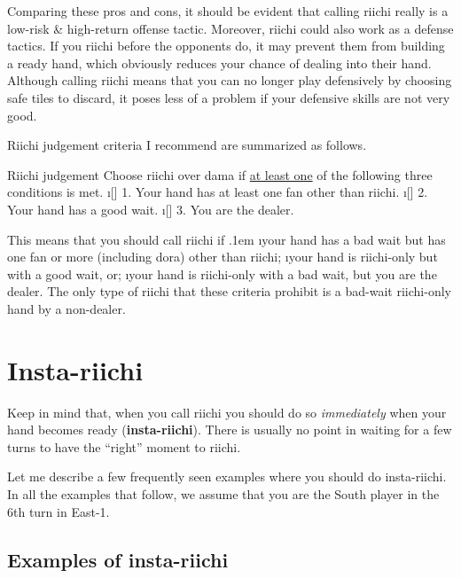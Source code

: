\bigskip
\noindent
Comparing these pros and cons, it should be evident that calling {\jap riichi} really is a low-risk \& high-return offense tactic. Moreover, {\jap riichi} could also work as a defense tactics. If you {\jap riichi} before the opponents do, it may prevent them from building a ready hand, which obviously reduces your chance of dealing into their hand. 
Although calling {\jap riichi} means that you can no longer play defensively by choosing safe tiles to discard, it poses less of a problem if your defensive skills are not very good. 

\bigskip

{\jap Riichi} judgement criteria I recommend are summarized as follows. 

\bigskip
\begin{itembox}[c]{{\jap Riichi} judgement}
Choose {\jap riichi} over {\jap dama} if \underline{\large at least one} of the following three conditions is met. 
\bi
\i[] 1. Your hand has at least one {\jap fan} other than {\jap riichi}.
\i[] 2. Your hand has a good wait.
\i[] 3. You are the dealer.
\ei \vsps
\end{itembox}

\newpage
\noindent This means that you should call {\jap riichi} if 
\bi \itemsep.1em
\i your hand has a bad wait but has one {\jap fan} or more (including {\jap dora}) other than {\jap riichi};
\i your hand is {\jap riichi}-only but with a good wait, or;
\i your hand is {\jap riichi}-only with a bad wait, but you are the dealer. 
\ei
The only type of {\jap riichi} that these criteria prohibit is a bad-wait {\jap riichi}-only hand by a non-dealer. 


\section{Insta-{\jap riichi}} 	
Keep in mind that, when you call {\jap riichi} you should do so \emph{immediately} when your hand becomes ready ({\bf insta-{\jap riichi}}). There is usually no point in waiting for a few turns to have the ``right'' moment to {\jap riichi}. 

\bigskip
Let me describe a few frequently seen examples where you should do insta-{\jap riichi}. 
In all the examples that follow, we assume that you are the South player in the 6th turn in East-1. 

\subsection{Examples of insta-{\jap riichi}}

